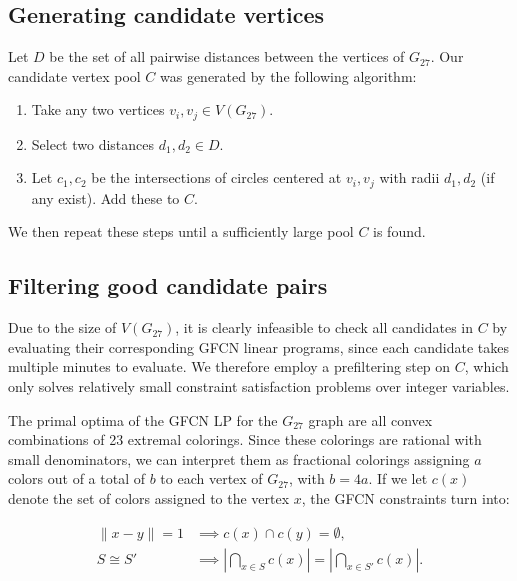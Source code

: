 \documentclass[pdflatex,sn-mathphys-num]{sn-jnl}%
\begin{document}
\subsection{Generating candidate vertices}
Let $D$ be the set of all pairwise distances between the vertices of $G_{27}$. Our candidate vertex pool $C$ was generated by the following algorithm:

\begin{enumerate}
    \item Take any two vertices $v_i, v_j \in V(G_{27})$.
    \item Select two distances $d_1, d_2 \in D$.
    \item Let $c_1, c_2$ be the intersections of circles centered at $v_i, v_j$ with radii $d_1, d_2$ (if any exist). Add these to $C$.
\end{enumerate}

We then repeat these steps until a sufficiently large pool $C$ is found.

\subsection{Filtering good candidate pairs}

Due to the size of $V(G_{27})$, it is clearly infeasible to check all candidates in $C$ by evaluating their corresponding GFCN linear programs, since each candidate takes multiple minutes to evaluate. We therefore employ a prefiltering step on $C$, which only solves relatively small constraint satisfaction problems over integer variables.

The primal optima of the GFCN LP for the $G_{27}$ graph are all convex combinations of 23 extremal colorings. Since these colorings are rational with small denominators, we can interpret them as fractional colorings assigning $a$ colors out of a total of $b$ to each vertex of $G_{27}$, with $b = 4a$. If we let $c(x)$ denote the set of colors assigned to the vertex $x$, the GFCN constraints turn into:

\begingroup
\setlength{\abovedisplayskip}{3pt}
\setlength{\belowdisplayskip}{3pt}
\setlength{\abovedisplayshortskip}{3pt}
\setlength{\belowdisplayshortskip}{3pt}
\begin{align}
    \|x-y\|=1
    &\implies c(x)\cap c(y)=\emptyset, \label{cond:edge} \\
    S\cong S'
    &\implies
    \left|\bigcap_{x\in S} c(x)\right|
    =
    \left|\bigcap_{x\in S'} c(x)\right|. \label{cond:geometric}
\end{align}
\endgroup
\end{document}

